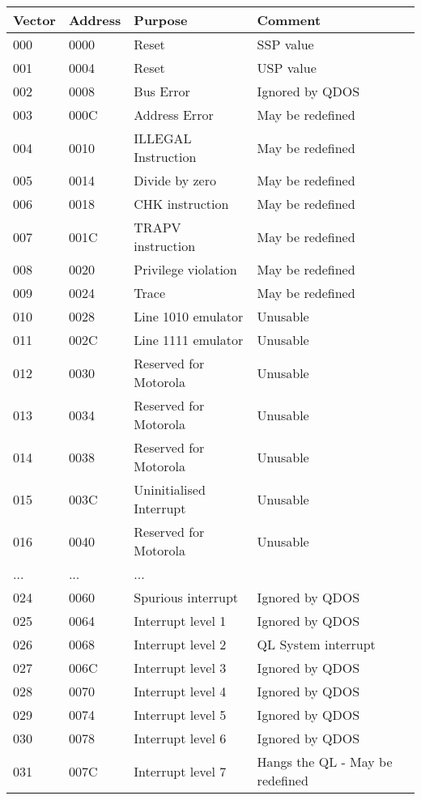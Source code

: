 \begin{table}[htbp]
\centering
\begin{tabular}{l l l l} %
\toprule
\textbf{Vector} & \textbf{Address} & \textbf{Purpose} & \textbf{Comment}\\
\midrule
%
000 & 0000 & Reset & SSP value \\
001 & 0004 & Reset & USP value \\
002 & 0008 & Bus Error & Ignored by QDOS \\
003 & 000C & Address Error & May be redefined \\
004 & 0010 & ILLEGAL Instruction & May be redefined \\
005 & 0014 & Divide by zero & May be redefined \\
006 & 0018 & CHK instruction & May be redefined \\
007 & 001C & TRAPV instruction & May be redefined \\
008 & 0020 & Privilege violation & May be redefined \\
009 & 0024 & Trace & May be redefined \\
010 & 0028 & Line 1010 emulator & Unusable \\
011 & 002C & Line 1111 emulator & Unusable \\
012 & 0030 & Reserved for Motorola & Unusable \\
013 & 0034 & Reserved for Motorola & Unusable \\
014 & 0038 & Reserved for Motorola & Unusable \\
015 & 003C & Uninitialised Interrupt & Unusable \\
016 & 0040 & Reserved for Motorola & Unusable \\
... & ... & ... & {} \\
024 & 0060 & Spurious interrupt & Ignored by QDOS \\
025 & 0064 & Interrupt level 1 & Ignored by QDOS \\
026 & 0068 & Interrupt level 2 & QL System interrupt \\
027 & 006C & Interrupt level 3 & Ignored by QDOS \\
028 & 0070 & Interrupt level 4 & Ignored by QDOS \\
029 & 0074 & Interrupt level 5 & Ignored by QDOS \\
030 & 0078 & Interrupt level 6 & Ignored by QDOS \\
031 & 007C & Interrupt level 7 & Hangs the QL -{} May be redefined \\

\end{tabular}
\end{table}
